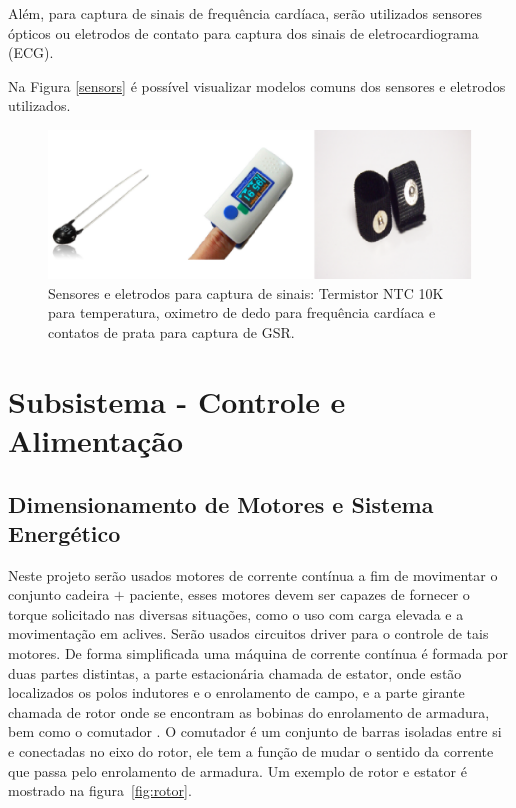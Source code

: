 Além, para captura de sinais de frequência cardíaca, serão utilizados sensores ópticos ou eletrodos de contato para captura dos sinais de eletrocardiograma (ECG).

Na Figura \ref{sensors} é possível visualizar modelos comuns dos sensores e eletrodos utilizados.

\begin{figure}[H]
  \centering
    \includegraphics[width=\textwidth]{figuras/sensors.eps}
  \caption{Sensores e eletrodos para captura de sinais: Termistor NTC 10K para temperatura, oximetro de dedo para frequência cardíaca e contatos de prata para captura de GSR.}
  \label{fig:sensors}
\end{figure}

\section{Subsistema - Controle e Alimentação}
\subsection{Dimensionamento de Motores e Sistema Energético}
Neste projeto serão usados motores de corrente contínua a fim de movimentar o conjunto
cadeira $+$ paciente, esses motores devem ser capazes de fornecer o torque solicitado
nas diversas situações, como o uso com carga elevada e a movimentação em aclives.
Serão usados circuitos driver para o controle de tais motores. De forma simplificada
uma máquina de corrente contínua é formada por duas partes distintas, a parte
estacionária chamada de estator, onde estão localizados os polos indutores e o
enrolamento de campo, e a parte girante chamada de rotor onde se encontram as
bobinas do enrolamento de armadura, bem como o comutador  \cite{bim}. O comutador
é um conjunto de barras isoladas entre si e conectadas no eixo do rotor, ele tem
a função de mudar o sentido da corrente que passa pelo enrolamento de armadura.
Um exemplo de rotor e estator é mostrado na figura~\ref{fig:rotor}.


